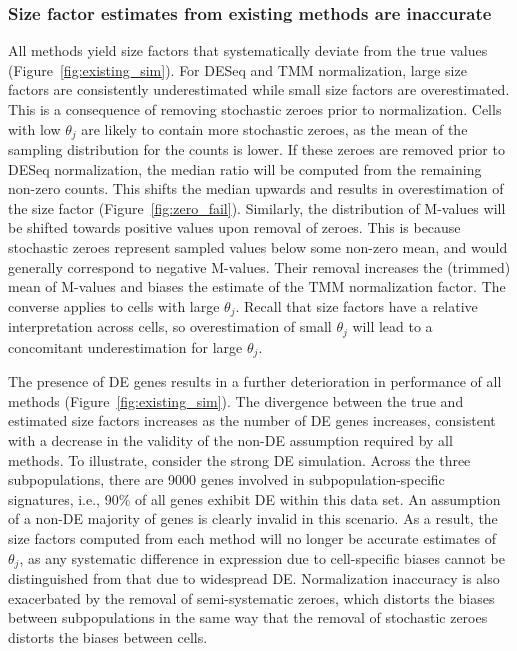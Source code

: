 \documentclass{bmcart}
\newcommand{\revised}[1]{#1}
\begin{document}
\subsubsection*{Size factor estimates from existing methods are inaccurate}
All methods yield size factors that systematically deviate from the true values (Figure~\ref{fig:existing_sim}).
For DESeq and TMM normalization, large size factors are consistently underestimated while small size factors are overestimated.
This is a consequence of removing stochastic zeroes prior to normalization.
Cells with low $\theta_j$ are likely to contain more stochastic zeroes, as the mean of the sampling distribution for the counts is lower.
If these zeroes are removed prior to DESeq normalization, the median ratio will be computed from the remaining non-zero counts.
This shifts the median upwards and results in overestimation of the size factor (Figure~\ref{fig:zero_fail}).
Similarly, the distribution of M-values will be shifted towards positive values upon removal of zeroes.
This is because stochastic zeroes represent sampled values below some non-zero mean, and would generally correspond to negative M-values.
Their removal increases the (trimmed) mean of M-values and biases the estimate of the TMM normalization factor.
The converse applies to cells with large $\theta_j$.
Recall that size factors have a relative interpretation across cells, so overestimation of small $\theta_j$ will lead to a concomitant underestimation for large $\theta_j$.


The presence of DE genes results in a further deterioration in performance of all methods (Figure~\ref{fig:existing_sim}).
The divergence between the true and estimated size factors increases as the number of DE genes increases,
    consistent with a decrease in the validity of the non-DE assumption required by all methods.
To illustrate, consider the strong DE simulation.
Across the three subpopulations, there are 9000 genes involved in subpopulation-specific signatures, i.e., 90\% of all genes exhibit DE within this data set.
An assumption of a non-DE majority of genes is clearly invalid in this scenario.
\revised{As a result, the size factors computed from each method will no longer be accurate estimates of $\theta_j$, as any systematic difference in expression due to cell-specific biases cannot be distinguished from that due to widespread DE.}
Normalization inaccuracy is also exacerbated by the removal of semi-systematic zeroes, which distorts the biases between subpopulations in the same way that the removal of stochastic zeroes distorts the biases between cells.
\end{document}
